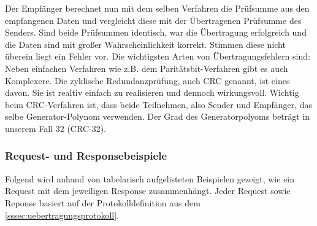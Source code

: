 Der Empfänger berechnet nun mit dem selben Verfahren die Prüfsumme aus den empfangenen Daten und vergleicht diese mit der Übertragenen Prüfsumme des Senders.
Sind beide Prüfsummen identisch, war die Übertragung erfolgreich und die Daten sind mit großer Wahrscheinlichkeit korrekt.
Stimmen diese nicht überein liegt ein Fehler vor.
Die wichtigsten Arten von Übertragungsfehlern sind:
Neben einfachen Verfahren wie z.B. dem Paritätsbit-Verfahren gibt es auch Komplexere. Die zyklische Redundanzprüfung, auch CRC genannt, ist eines davon.
Sie ist realtiv einfach zu realisieren und dennoch wirkungsvoll.
Wichtig beim CRC-Verfahren ist, dass beide Teilnehmen, also Sender und Empfänger, das selbe Generator-Polynom verwenden. Der Grad des Generatorpolyoms beträgt in unserem Fall 32 (CRC-32).
\subsubsection{Request- und Responsebeispiele}
Folgend wird anhand von tabelarisch aufgelisteten Beispielen gezeigt, wie ein Request mit dem jeweiligen Response zusammenhängt.
Jeder Request sowie Reponse basiert auf der Protokolldefinition aus dem \autoref{sssec:uebertragungsprotokoll}.
\begin{table}[H]
\centering
{}
\caption{Request- und Responsebeispiele Tabellarisch dargestellt}
\end{table}

